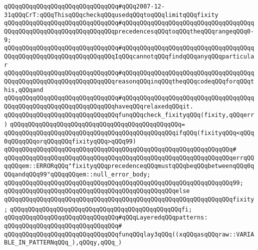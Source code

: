 \verb|qQQqqQQqqQQqqQQqqQQqqQQqqQQqqQQq#qQQq2007-12-31qQQqCrT:qQQqThisqQQqcheckqQQqusedqQQqtoqQQqlimitqQQqfixity|\newline
\verb|qQQqqQQqqQQqqQQqqQQqqQQqqQQqqQQq#qQQqqQQqqQQqqQQqqQQqqQQqqQQqqQQqqQQqqQQqqQQqqQQqqQQqqQQqqQQqqQQqqQQqprecedencesqQQqtoqQQqtheqQQqrangeqQQq0-9;|\newline
\verb|qQQqqQQqqQQqqQQqqQQqqQQqqQQqqQQq#qQQqqQQqqQQqqQQqqQQqqQQqqQQqqQQqqQQqqQQqqQQqqQQqqQQqqQQqqQQqqQQqqQQqIqQQqcannotqQQqfindqQQqanyqQQqparticular|\newline
\verb|qQQqqQQqqQQqqQQqqQQqqQQqqQQqqQQq#qQQqqQQqqQQqqQQqqQQqqQQqqQQqqQQqqQQqqQQqqQQqqQQqqQQqqQQqqQQqqQQqqQQqreasonqQQqinqQQqtheqQQqcodeqQQqforqQQqthis,qQQqand|\newline
\verb|qQQqqQQqqQQqqQQqqQQqqQQqqQQqqQQq#qQQqqQQqqQQqqQQqqQQqqQQqqQQqqQQqqQQqqQQqqQQqqQQqqQQqqQQqqQQqqQQqqQQqhaveqQQqrelaxedqQQqit.|\newline
\newline
\verb|qQQqqQQqqQQqqQQqqQQqqQQqqQQqqQQqfunqQQqcheck_fixityqQQq(fixity,qQQqerr)|\newline
\verb|qQQqqQQqqQQqqQQqqQQqqQQqqQQqqQQqqQQqqQQqqQQqqQQq=|\newline
\verb|qQQqqQQqqQQqqQQqqQQqqQQqqQQqqQQqqQQqqQQqqQQqqQQqifqQQq(fixityqQQq<qQQq0qQQqqQQqorqQQqqQQqfixityqQQq>qQQq99)|\newline
\verb|qQQqqQQqqQQqqQQqqQQqqQQqqQQqqQQqqQQqqQQqqQQqqQQqqQQqqQQqqQQqqQQq#|\newline
\verb|qQQqqQQqqQQqqQQqqQQqqQQqqQQqqQQqqQQqqQQqqQQqqQQqqQQqqQQqqQQqqQQqerrqQQqqQQqem::ERRORqQQq"fixityqQQqprecedenceqQQqmustqQQqbeqQQqbetweenqQQq0qQQqandqQQq99"qQQqqQQqem::null_error_body;|\newline
\verb|qQQqqQQqqQQqqQQqqQQqqQQqqQQqqQQqqQQqqQQqqQQqqQQqqQQqqQQqqQQqqQQq99;|\newline
\verb|qQQqqQQqqQQqqQQqqQQqqQQqqQQqqQQqqQQqqQQqqQQqqQQqelse|\newline
\verb|qQQqqQQqqQQqqQQqqQQqqQQqqQQqqQQqqQQqqQQqqQQqqQQqqQQqqQQqqQQqqQQqfixity;|\newline
\verb|qQQqqQQqqQQqqQQqqQQqqQQqqQQqqQQqqQQqqQQqqQQqqQQqfi;|\newline
\newline
\verb|qQQqqQQqqQQqqQQqqQQqqQQqqQQqqQQq#qQQqLayeredqQQqpatterns:|\newline
\verb|qQQqqQQqqQQqqQQqqQQqqQQqqQQqqQQq#|\newline
\verb|qQQqqQQqqQQqqQQqqQQqqQQqqQQqqQQqfunqQQqlay3qQQq((xqQQqasqQQqraw::VARIABLE_IN_PATTERNqQQq_),qQQqy,qQQq_)|\newline
